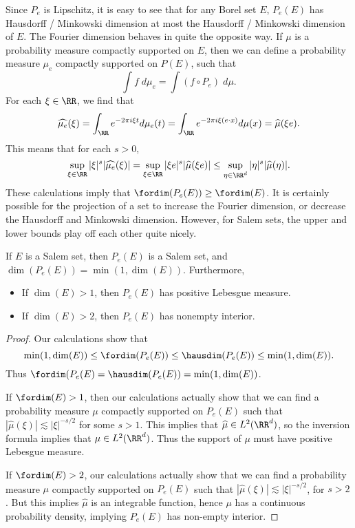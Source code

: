 Since $P_e$ is Lipschitz, it is easy to see that for any Borel set $E$, $P_e(E)$ has Hausdorff / Minkowski dimension at most the Hausdorff / Minkowski dimension of $E$. The Fourier dimension behaves in quite the opposite way. If $\mu$ is a probability measure compactly supported on $E$, then we can define a probability measure $\mu_e$ compactly supported on $P(E)$, such that
%
\[ \int f\; d\mu_e = \int (f \circ P_e)\; d\mu. \]
%
For each $\xi \in \RR$, we find that
%
\[ \widehat{\mu_e}(\xi) = \int_{\RR} e^{-2 \pi i \xi t} d\mu_e(t) = \int_{\RR} e^{-2 \pi i \xi (e \cdot x)} d\mu(x) = \widehat{\mu}(\xi e). \]
%
This means that for each $s > 0$,
%
\[ \sup_{\xi \in \RR} |\xi|^s |\widehat{\mu_e}(\xi)| = \sup_{\xi \in \RR} |\xi e|^s |\widehat{\mu}(\xi e)| \leq \sup_{\eta \in \RR^d} |\eta|^s |\widehat{\mu}(\eta)|. \]
%
These calculations imply that $\fordim(P_e(E)) \geq \fordim(E)$. It is certainly possible for the projection of a set to increase the Fourier dimension, or decrease the Hausdorff and Minkowski dimension. However, for Salem sets, the upper and lower bounds play off each other quite nicely.

\begin{theorem}
	If $E$ is a Salem set, then $P_e(E)$ is a Salem set, and $\dim(P_e(E)) = \min(1, \dim(E))$. Furthermore,
	\begin{itemize}
		\item If $\dim(E) > 1$, then $P_e(E)$ has positive Lebesgue measure.
		\item If $\dim(E) > 2$, then $P_e(E)$ has nonempty interior.
	\end{itemize}
\end{theorem}
\begin{proof}
	Our calculations show that
	\[ \min(1,\dim(E)) \leq \fordim(P_e(E)) \leq \hausdim(P_e(E)) \leq \min(1,\dim(E)). \]
	Thus $\fordim(P_e(E) = \hausdim(P_e(E)) = \min(1,\dim(E))$.

	If $\fordim(E) > 1$, then our calculations actually show that we can find a probability measure $\mu$ compactly supported on $P_e(E)$ such that $|\widehat{\mu}(\xi)| \lesssim |\xi|^{-s/2}$ for some $s > 1$. This implies that $\widehat{\mu} \in L^2(\RR^d)$, so the inversion formula implies that $\mu \in L^2(\RR^d)$. Thus the support of $\mu$ must have positive Lebesgue measure.

	If $\fordim(E) > 2$, our calculations actually show that we can find a probability measure $\mu$ compactly supported on $P_e(E)$ such that $|\widehat{\mu}(\xi)| \lesssim |\xi|^{-s/2}$, for $s > 2$. But this implies $\widehat{\mu}$ is an integrable function, hence $\mu$ has a continuous probability density, implying $P_e(E)$ has non-empty interior.
\end{proof}

